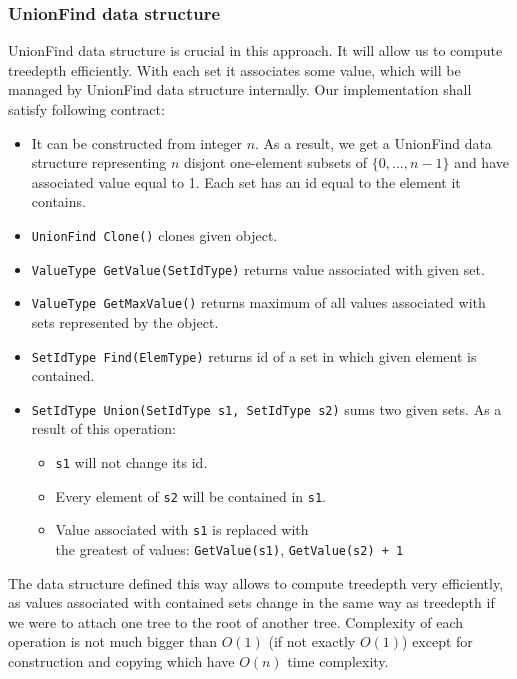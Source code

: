 \subsubsection{UnionFind data structure}
UnionFind data structure is crucial in this approach. It will allow us to compute treedepth efficiently. With each set it associates some value, which will be managed by UnionFind data structure internally. Our implementation shall satisfy following contract:
\begin{itemize}
	\item It can be constructed from integer $n$. As a result, we get a UnionFind data structure representing $n$ disjont one-element subsets of $\{0,...,n-1\}$ and have associated value equal to 1. Each set has an id equal to the element it contains.
	\item \texttt{UnionFind Clone()} clones given object.
	\item \texttt{ValueType GetValue(SetIdType)} returns value associated with given set.
	\item \texttt{ValueType GetMaxValue()} returns maximum of all values associated with sets represented by the object.
	\item \texttt{SetIdType Find(ElemType)} returns id of a set in which given element is contained.
	\item \texttt{SetIdType Union(SetIdType s1, SetIdType s2)} sums two given sets. As a result of this operation:
	\begin{itemize}
		\item \texttt{s1} will not change its id.
		\item Every element of \texttt{s2} will be contained in \texttt{s1}.
		\item Value associated with \texttt{s1} is replaced with \\ the greatest of values: \texttt{GetValue(s1)}, \texttt{GetValue(s2) + 1}
	\end{itemize}
\end{itemize}
The data structure defined this way allows to compute treedepth very efficiently, as values associated with contained sets change in the same way as treedepth if we were to attach one tree to the root of another tree. Complexity of each operation is not much bigger than $O(1)$ (if not exactly $O(1)$) except for construction and copying which have $O(n)$ time complexity.

